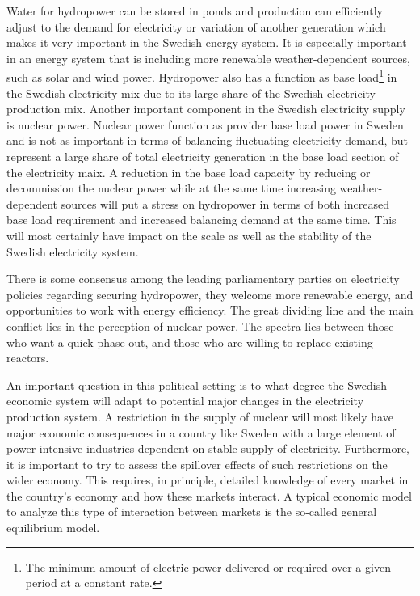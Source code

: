\documentclass[10pt,a4paper]{article}
\begin{document}
Water for hydropower can be stored in ponds and production can efficiently adjust to the demand for electricity or variation of another generation which makes it very important in the Swedish energy system. It is especially important in an energy system that is including more renewable weather-dependent sources, such as solar and wind power. Hydropower also has a function as base load\footnote{The minimum amount of electric power delivered or required over a given period at a constant rate.} in the Swedish electricity mix due to its large share of the Swedish electricity production mix. Another important component in the Swedish electricity supply is nuclear power. Nuclear power function as provider base load power in Sweden and is not as important in terms of balancing fluctuating electricity demand, but represent a large share of total electricity generation in the base load section of the electricity maix. A reduction in the base load capacity by reducing or decommission the nuclear power while at the same time increasing weather-dependent sources will put a stress on hydropower in terms of both increased base load requirement and increased balancing demand at the same time. This will most certainly have impact on the scale as well as the stability of the Swedish electricity system.

There is some consensus among the leading parliamentary parties on electricity policies regarding securing hydropower, they welcome more renewable energy, and opportunities to work with energy efficiency. The great dividing line and the main conflict lies in the perception of nuclear power. The spectra lies between those who want a quick phase out, and those who are willing to replace existing reactors.

An important question in this political setting is to what degree the Swedish economic system will adapt to potential major changes in the electricity production system. A restriction in the supply of nuclear will most likely have major economic consequences in a country like Sweden with a large element of power-intensive industries dependent on stable supply of electricity. Furthermore, it is important to try to assess the spillover effects of such restrictions on the wider economy. This requires, in principle, detailed knowledge of every market in the country's economy and how these markets interact. A typical economic model to analyze this type of interaction between markets is the so-called general equilibrium model.
\end{document}
